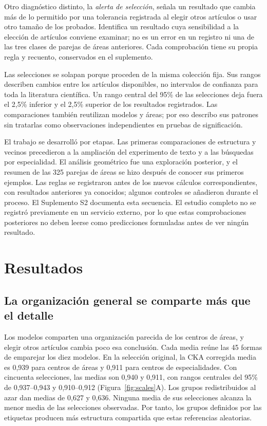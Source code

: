 \documentclass[12pt]{article}
\begin{document}
Otro diagnóstico distinto, la \emph{alerta de selección}, señala un resultado que cambia más de lo permitido por una tolerancia registrada al elegir otros artículos o usar otro tamaño de los probados. Identifica un resultado cuya sensibilidad a la elección de artículos conviene examinar; no es un error en un registro ni una de las tres clases de parejas de áreas anteriores. Cada comprobación tiene su propia regla y recuento, conservados en el suplemento.

Las selecciones se solapan porque proceden de la misma colección fija. Sus rangos describen cambios entre los artículos disponibles, no intervalos de confianza para toda la literatura científica. Un rango central del 95\% de las selecciones deja fuera el 2,5\% inferior y el 2,5\% superior de los resultados registrados. Las comparaciones también reutilizan modelos y áreas; por eso describo sus patrones sin tratarlas como observaciones independientes en pruebas de significación.

El trabajo se desarrolló por etapas. Las primeras comparaciones de estructura y vecinos precedieron a la ampliación del experimento de texto y a las búsquedas por especialidad. El análisis geométrico fue una exploración posterior, y el resumen de las 325 parejas de áreas se hizo después de conocer sus primeros ejemplos. Las reglas se registraron antes de los nuevos cálculos correspondientes, con resultados anteriores ya conocidos; algunos controles se añadieron durante el proceso. El Suplemento S2 documenta esta secuencia. El estudio completo no se registró previamente en un servicio externo, por lo que estas comprobaciones posteriores no deben leerse como predicciones formuladas antes de ver ningún resultado.

\section{Resultados}
\FloatBarrier
\subsection{La organización general se comparte más que el detalle}
Los modelos comparten una organización parecida de los centros de áreas, y elegir otros artículos cambia poco esa conclusión. Cada media reúne las 45 formas de emparejar los diez modelos. En la selección original, la CKA corregida media es 0,939 para centros de áreas y 0,911 para centros de especialidades. Con cincuenta selecciones, las medias son 0,940 y 0,911, con rangos centrales del 95\% de 0,937--0,943 y 0,910--0,912 (Figura~\ref{fig:scales}A). Los grupos redistribuidos al azar dan medias de 0,627 y 0,636. Ninguna media de sus selecciones alcanza la menor media de las selecciones observadas. Por tanto, los grupos definidos por las etiquetas producen más estructura compartida que estas referencias aleatorias.
\end{document}
